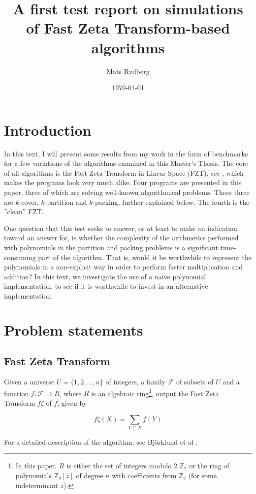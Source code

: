 \documentclass[a4paper, titlepage]{article}
\title{\huge{A first test report on simulations of Fast Zeta Transform-based algorithms}}
\author{Mats Rydberg}
\date{\today}
\begin{document}
\maketitle

\tableofcontents

\section{Introduction}
In this text, I will present some results from my work in the form of benchmarks for a few variations of the algorithms examined in this Master's Thesis. The core of all algorithms is the Fast Zeta Transform in Linear Space (FZT), see \cite{cov_pack}, which makes the programs look very much alike. Four programs are presented in this paper, three of which are solving well-known algorithmical problems. These three are $k$-cover, $k$-partition and $k$-packing, further explained below. The fourth is the ''clean'' FZT.

One question that this test seeks to answer, or at least to make an indication toward an answer for, is whether the complexity of the arithmetics performed with polynomials in the partition and packing problems is a significant time-consuming part of the algorithm. That is, would it be worthwhile to represent the polynomials in a non-explicit way in order to perform faster multiplication and addition? In this text, we investigate the use of a naive polynomial implementation, to see if it is worthwhile to invest in an alternative implementation.

\section{Problem statements}

\subsection{Fast Zeta Transform}
Given a universe $U = \{1, 2, \ldots, n\}$ of integers, a family $\mathcal{F}$ of subsets of $U$ and a function $f: \mathcal{F} \rightarrow R$, where $R$ is an algebraic ring\footnote{In this paper, $R$ is either the set of integers modulo 2 $\mathbb{Z}_2$ or the ring of polynomials $\mathbb{Z}_2[z]$ of degree $n$ with coefficients from $\mathbb{Z}_2$ (for some indeterminant $z$).}, output the Fast Zeta Transform $f\zeta$ of $f$, given by

$$
f\zeta (X) = \sum_{Y\subseteq X}f(Y)
$$

For a detailed description of the algorithm, see Björklund et al \cite{cov_pack}.
\end{document}
